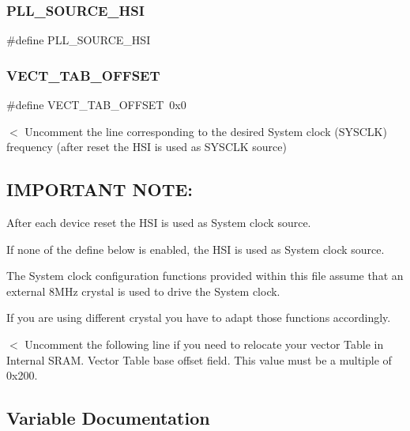 \subsubsection{\texorpdfstring{PLL\_SOURCE\_HSI}{PLL\_SOURCE\_HSI}}
{\footnotesize\ttfamily \#define P\+L\+L\+\_\+\+S\+O\+U\+R\+C\+E\+\_\+\+H\+SI}

\mbox{\label{group___s_t_m32_f10x___system___private___defines_ga40e1495541cbb4acbe3f1819bd87a9fe}} 
\subsubsection{\texorpdfstring{VECT\_TAB\_OFFSET}{VECT\_TAB\_OFFSET}}
{\footnotesize\ttfamily \#define V\+E\+C\+T\+\_\+\+T\+A\+B\+\_\+\+O\+F\+F\+S\+ET~0x0}

$<$ Uncomment the line corresponding to the desired System clock (S\+Y\+S\+C\+LK) frequency (after reset the H\+SI is used as S\+Y\+S\+C\+LK source)

\subsection*{I\+M\+P\+O\+R\+T\+A\+NT N\+O\+TE\+: }


\begin{DoxyEnumerate}
\item After each device reset the H\+SI is used as System clock source.
\item If none of the define below is enabled, the H\+SI is used as System clock source.
\item The System clock configuration functions provided within this file assume that an external 8M\+Hz crystal is used to drive the System clock.

If you are using different crystal you have to adapt those functions accordingly.
\end{DoxyEnumerate}

$<$ Uncomment the following line if you need to relocate your vector Table in Internal S\+R\+AM. Vector Table base offset field. This value must be a multiple of 0x200. 

\subsection{Variable Documentation}
\mbox{\label{group___s_t_m32_f10x___system___private___defines_gacdc3ef54c0704c90e69a8a84fb2d970d}} 
